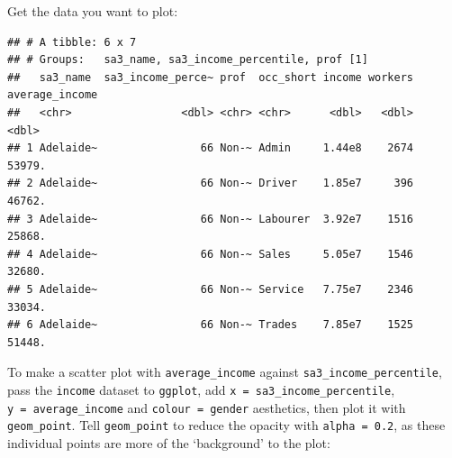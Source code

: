 \documentclass[]{book}
\newenvironment{Shaded}{\begin{snugshade}}{\end{snugshade}}
\newcommand{\DataTypeTok}[1]{\textcolor[rgb]{0.13,0.29,0.53}{#1}}
\newcommand{\DecValTok}[1]{\textcolor[rgb]{0.00,0.00,0.81}{#1}}
\newcommand{\KeywordTok}[1]{\textcolor[rgb]{0.13,0.29,0.53}{\textbf{#1}}}
\newcommand{\NormalTok}[1]{#1}
\newcommand{\OperatorTok}[1]{\textcolor[rgb]{0.81,0.36,0.00}{\textbf{#1}}}
\newcommand{\StringTok}[1]{\textcolor[rgb]{0.31,0.60,0.02}{#1}}
\begin{document}
Get the data you want to plot:

\begin{Shaded}
\end{Shaded}

\begin{verbatim}
## # A tibble: 6 x 7
## # Groups:   sa3_name, sa3_income_percentile, prof [1]
##   sa3_name  sa3_income_perce~ prof  occ_short income workers average_income
##   <chr>                 <dbl> <chr> <chr>      <dbl>   <dbl>          <dbl>
## 1 Adelaide~                66 Non-~ Admin     1.44e8    2674         53979.
## 2 Adelaide~                66 Non-~ Driver    1.85e7     396         46762.
## 3 Adelaide~                66 Non-~ Labourer  3.92e7    1516         25868.
## 4 Adelaide~                66 Non-~ Sales     5.05e7    1546         32680.
## 5 Adelaide~                66 Non-~ Service   7.75e7    2346         33034.
## 6 Adelaide~                66 Non-~ Trades    7.85e7    1525         51448.
\end{verbatim}

To make a scatter plot with \texttt{average\_income} against \texttt{sa3\_income\_percentile}, pass the \texttt{income} dataset to \texttt{ggplot}, add \texttt{x\ =\ sa3\_income\_percentile}, \texttt{y\ =\ average\_income} and \texttt{colour\ =\ gender} aesthetics, then plot it with \texttt{geom\_point}. Tell \texttt{geom\_point} to reduce the opacity with \texttt{alpha\ =\ 0.2}, as these individual points are more of the `background' to the plot:
\end{document}
